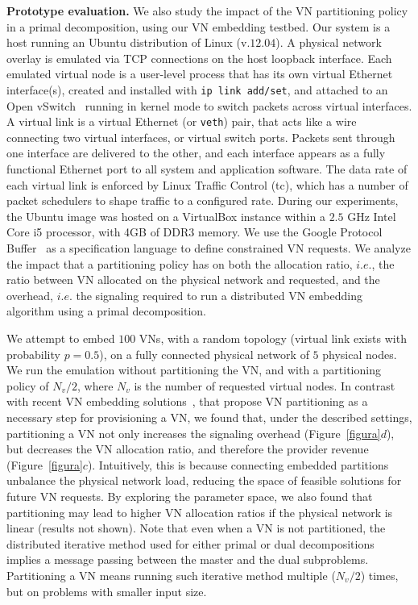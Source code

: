 \documentclass[a4paper, 10pt, conference]{ieeeconf}
\begin{document}
\noindent
{\bf Prototype evaluation.} We also study the impact of the VN partitioning policy in a primal decomposition, using our VN embedding testbed. Our system is a host running an Ubuntu distribution of Linux (v.$12.04$).  A physical network overlay is emulated via TCP connections on the host loopback interface. 
Each emulated virtual node is a user-level process that has its own virtual Ethernet interface(s), created and installed with {\tt ip link add/set}, and attached to an Open vSwitch~\cite{openvswitch} running in kernel mode to switch packets across virtual interfaces. 
A virtual link is a virtual Ethernet (or {\tt veth}) pair, that acts like a wire connecting two virtual interfaces, or virtual switch ports. Packets sent through one interface are delivered to the other, and each interface appears as a fully functional Ethernet port to all system and application software. The data rate of each virtual link is enforced by Linux Traffic Control (tc), which has a number of packet schedulers to shape traffic to a configured rate. 
During our experiments, the Ubuntu image was hosted on a VirtualBox instance within a $2.5$ GHz Intel Core i5 processor, with 4GB of DDR3 memory. We use the Google Protocol Buffer~\cite{GoogleProtocolBuffer} as a specification language to define constrained VN requests. We analyze the impact that a partitioning policy has on both the allocation ratio, $i.e.$, the ratio between VN allocated on the physical network and requested, and the overhead, $i.e.$ the signaling required to run a distributed VN embedding algorithm using a primal decomposition. 

We attempt to embed $100$ VNs, with a random topology (virtual link exists with probability $p =0.5$), on a fully connected physical network of $5$ physical nodes.
We run the emulation without partitioning the VN, and with a partitioning policy of $N_v/2$, where $N_v$ is the number of requested virtual nodes. In contrast with recent VN embedding solutions~\cite{Houidi2011}, that propose VN partitioning as a necessary step for provisioning a VN, we found that, under the described settings, partitioning a VN not only increases the signaling overhead (Figure~\ref{figura}$d$), but decreases the VN allocation ratio, and therefore the provider revenue (Figure~\ref{figura}$c$). Intuitively, this is because connecting  embedded partitions unbalance the physical network load, reducing the space of feasible solutions for future VN requests.  By exploring the parameter space, we also found that partitioning may lead to higher VN allocation ratios if the physical network is linear (results not shown).   Note that even when a VN is not partitioned, the distributed iterative method used for either primal or dual decompositions implies a message passing between the master and the dual subproblems. Partitioning a VN means running such iterative method multiple ($N_v/2$) times, but on problems with smaller input size.
\end{document}
